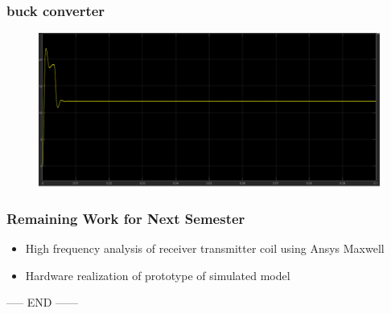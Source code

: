 \documentclass{beamer}
\begin{document}
\begin{frame}
  \frametitle{buck converter}
\begin{figure}[htbp]
  \centering
{}
 {\includegraphics[scale=0.5]{jpgs/buck_graph.png}}
\end{figure}
\end{frame}

\begin{frame}
  \frametitle{Remaining Work for Next Semester}
  \begin{itemize}
    \item High frequency analysis of receiver transmitter coil using Ansys Maxwell
    \item Hardware realization of prototype of simulated model
  \end{itemize}
\end{frame}

\begin{frame}
  \center
  {\huge ----- END ------}
\end{frame}
\end{document}
